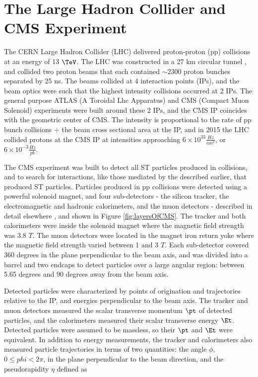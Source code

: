 \chapter{The Large Hadron Collider and CMS Experiment}
\label{sec:experiment_chapter}
The CERN Large Hadron Collider (LHC) delivered proton-proton (pp) collisions at an energy of 13 $\TeV$.  The LHC 
was constructed in a 27 km circular tunnel \cite{lhcTDR}, and collided two proton beams that each contained 
$\sim$2300 proton bunches separated by 25 ns.  The beams collided at 4 interaction points (IPs), and the beam optics 
were such that the highest intensity collisions occurred at 2 IPs.  The general purpose ATLAS 
(A Toroidal Lhc Apparatus) \cite{atlasTdrPhysPerformance} and CMS (Compact Muon Solenoid) \cite{cmsTdrPhysPerformance} 
experiments were built around these 2 IPs, and the CMS IP coincides with the geometric center of CMS.  The 
intensity is proportional to the rate of pp bunch collisions $\div$ the beam cross sectional area at the IP, 
and in 2015 the LHC collided protons at the CMS IP at intensities approaching $6 \times 10^{33} \frac{Hz}{cm^{2}}$, 
or $6 \times 10^{-3} \frac{Hz}{pb}$.

The CMS experiment was built to detect all ST particles produced in collisions, and to search for interactions, like 
those mediated by the \WR described earlier, that produced ST particles.  Particles produced in pp collisions were 
detected using a powerful solenoid magnet, and four sub-detectors - the silicon tracker, the electromagnetic and 
hadronic calorimeters, and the muon detectors - described in detail elsewhere \cite{cmsDetectorPaper}, and shown in 
Figure \ref{fig:layersOfCMS}.  The tracker and both calorimeters were inside the solenoid magnet where the magnetic 
field strength was 3.8 $\unit{T}$.  The muon detectors were located in the magnet iron return yoke where the magnetic 
field strength varied between 1 and 3 $\unit{T}$.  Each sub-detector covered 360 degrees in the plane perpendicular 
to the beam axis, and was divided into a barrel and two endcaps to detect particles over a large angular region: 
between 5.65 degrees and 90 degrees away from the beam axis.

Detected particles were characterized by points of origination and trajectories relative to the IP, and energies 
perpendicular to the beam axis.  The tracker and muon detectors measured the scalar transverse momentum $\pt$ of 
detected particles, and the calorimeters measured their scalar transverse energy $\Et$.  Detected particles were 
assumed to be massless, so their $\pt$ and $\Et$ were equivalent.  In addition to energy measurements, the tracker 
and calorimeters also measured particle trajectories in terms of two quantities: the angle $\phi$, $0 \leq phi < 2\pi$, 
in the plane perpendicular to the beam direction, and the pseudorapidity $\eta$ defined as

